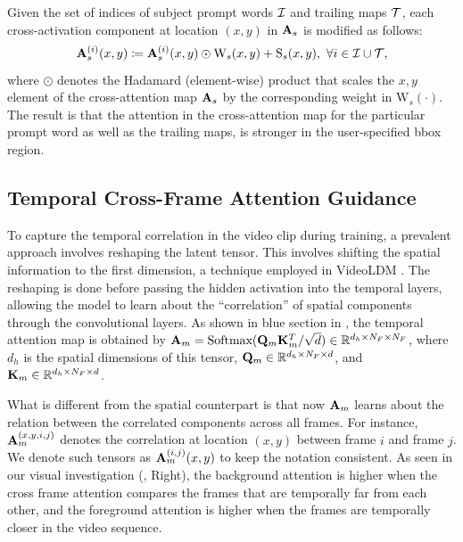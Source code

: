 Given the set of indices of subject prompt words $\mathcal{I}$ and trailing maps $\mathcal{T}$, each cross-activation component at location $(x,y)$ in $\mathbf{A}_s$ is modified as follows:
\begin{equation}
    \mathbf{A}_s^{(i)}(x,y) \coloneqq \mathbf{A}_s^{(i)}(x,y) \odot \text{W}_s(x,y) + \text{S}_s(x,y),\ \forall i \in \mathcal{I} \cup \mathcal{T},
\label{eq:sa}
\end{equation}
where $\odot$ denotes the Hadamard (element-wise) product that scales the $x,y$ element of the cross-attention map $\mathbf{A}_s$ by the corresponding weight in $\text{W}_s(\cdot)$. The result is that the attention in the cross-attention map for the particular prompt word as well as the trailing maps, is stronger in the user-specified bbox region.

\subsection{Temporal Cross-Frame Attention Guidance}
\label{ssec:tattn}

To capture the temporal correlation in the video clip during training, a prevalent approach involves reshaping the latent tensor. This involves shifting the spatial information to the first dimension, a technique employed in VideoLDM \cite{blattmann2023videoldm}. The reshaping is done before passing the hidden activation into the temporal layers, allowing the model to learn about the ``correlation'' of spatial components through the convolutional layers. As shown in blue section in , the temporal attention map is obtained by $\mathbf{A}_m = \text{Softmax}(\mathbf{Q}_m\mathbf{K}_m^{T}/\sqrt{d}) \in \mathbb{R}^{d_h \times N_F \times N_F}$, where $d_h$ is the spatial dimensions of this tensor,  $\mathbf{Q}_m \in \mathbb{R}^{d_{h} \times N_F \times d}$, and $\mathbf{K}_m \in \mathbb{R}^{d_{h} \times N_F \times d}$.   %

What is different from the spatial counterpart is that now $\mathbf{A}_m$ learns about the relation between the correlated components across all frames. For instance, $\mathbf{A}_m^{(x,y,i,j)}$ denotes the correlation at location $(x,y)$ between frame $i$ and frame $j$. We denote such tensors as $\mathbf{A}_m^{(i,j)}(x,y)$ to keep the notation consistent. As seen in our visual investigation (, Right), the background attention is higher when the cross frame attention compares the frames that are temporally far from each other, and the foreground attention is higher when the frames are temporally closer in the video sequence.

